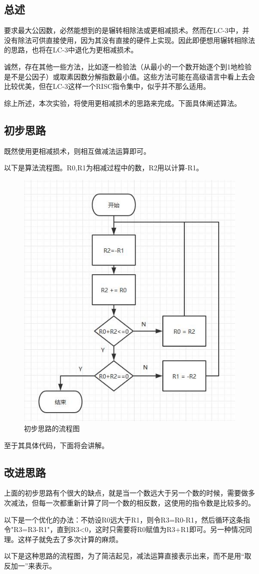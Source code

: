 \documentclass[UTF8]{article}
\begin{document}
	\subsection{总述}
	要求最大公因数，必然能想到的是辗转相除法或更相减损术。然而在LC-3中，并没有除法可供直接使用，因为其没有直接的硬件上实现。因此即便想用辗转相除法的思路，也将在LC-3中退化为更相减损术。\par
	诚然，存在其他一些方法，比如逐一检验法（从最小的一个数开始逐个到1地检验是不是公因子）或取素因数分解指数最小值。这些方法可能在高级语言中看上去会比较优美，但在LC-3这样一个RISC指令集中，似乎并不那么适用。\par
	综上所述，本次实验，将使用更相减损术的思路来完成。下面具体阐述算法。\par
	\subsection{初步思路}
	既然使用更相减损术，则相互做减法运算即可。\par
	以下是算法流程图。R0,R1为相减过程中的数，R2用以计算-R1。\par
	\begin{figure}[H]
		\centering
		\includegraphics[width=0.6\linewidth]{process1.jpg}
		\caption{初步思路的流程图}
		\label{process1}
	\end{figure}\par
	至于其具体代码，下面将会讲解。\par

	\subsection{改进思路}
	上面的初步思路有个很大的缺点，就是当一个数远大于另一个数的时候，需要做多次减法，但每一次都重新计算了同一个数的相反数，这使用的指令数是比较多的。\par
	以下是一个优化的办法：不妨设R0远大于R1，则令R3=R0-R1，然后循环这条指令"R3=R3-R1"，直到R3<0，这时只需要将R0赋值为R3+R1即可。另一种情况同理。这样子就免去了多次计算的麻烦。\par
	以下是这种思路的流程图，为了简洁起见，减法运算直接表示出来，而不是用“取反加一”来表示。\par
	
\end{document}
